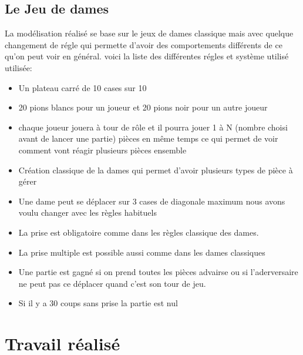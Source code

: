 \documentclass[11pt]{article} %
\begin{document}
\subsection{Le Jeu de dames}
La modélisation réalisé se base sur le jeux de dames classique mais avec quelque changement de régle qui permette d'avoir des comportements différents de ce qu'on peut voir en général. voici la liste des différentes régles et système utilisé utilisée:
\begin{itemize}
\item Un plateau carré de 10 cases sur 10
\item 20 pions blancs pour un joueur et 20 pions noir pour un autre joueur
\item chaque joueur jouera à tour de rôle et il pourra jouer 1 à N (nombre choisi avant de lancer une partie) pièces en même temps ce qui permet de voir comment vont réagir plusieurs pièces ensemble
\item Création classique de la dames qui permet d'avoir plusieurs types de pièce à gérer
\item Une dame peut se déplacer sur 3 cases de diagonale maximum nous avons voulu changer avec les règles habituels
\item La prise est obligatoire comme dans les règles classique des dames.
\item La prise multiple est possible aussi comme dans les dames classiques
\item Une partie est gagné si on prend toutes les pièces advairse ou si l'aderversaire ne peut pas ce déplacer quand c'est son tour de jeu.
\item Si il y a 30 coups sans prise la partie est nul
\end{itemize}

\section{Travail réalisé}
\end{document}

